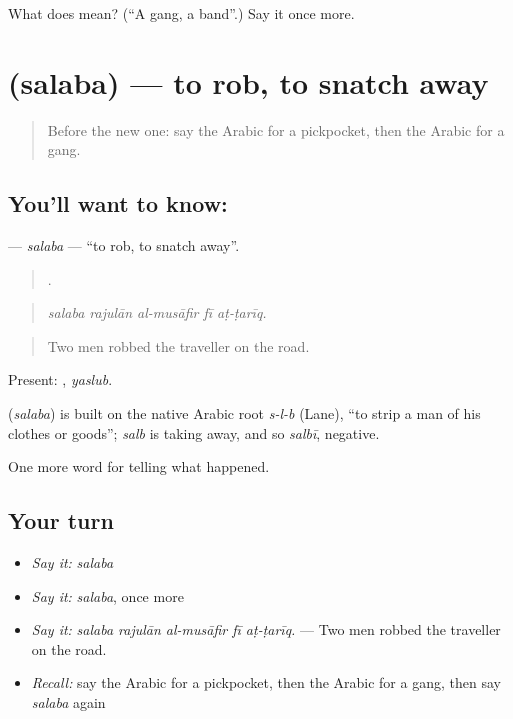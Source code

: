 \begin{tcolorbox}[breakable,colback=teal!4,colframe=teal!35!black,title={Before you move on}]
What does  mean? (\textquotedblleft{}A gang, a band\textquotedblright{}.) Say it once more.
\end{tcolorbox}
\section[\texorpdfstring{\ar{سلب} (salaba)}{سلب (salaba)}]{ (salaba) — to rob, to snatch away}

\label{lesson:AR-C321-salaba}



\begin{quote}
Before the new one: say the Arabic for a pickpocket, then the Arabic for a gang.
\end{quote}

\subsection*{You'll want to know: }
\textbf{} — \emph{salaba} — \textquotedblleft{}to rob, to snatch away\textquotedblright{}.

\begin{quote}
    .
\end{quote}

\begin{quote}
\emph{salaba rajulān al-musāfir fī aṭ-ṭarīq.}
\end{quote}

\begin{quote}
Two men robbed the traveller on the road.
\end{quote}

Present: , \emph{yaslub}.

\begin{cousinweb}
\textbf{} (\emph{salaba}) is built on the native Arabic root \emph{s-l-b} (Lane), \textquotedblleft{}to strip a man of his clothes or goods\textquotedblright{}; \emph{salb} is taking away, and so \emph{salbī}, negative.
\end{cousinweb}

\begin{grammarlens}[title={What you've built}]
One more word for telling what happened.
\end{grammarlens}

\subsection*{Your turn}
\begin{itemize}
\raggedright
  \item \emph{Say it:} \emph{salaba}
  \item \emph{Say it:} \emph{salaba}, once more
  \item \emph{Say it:} \emph{salaba rajulān al-musāfir fī aṭ-ṭarīq.} — Two men robbed the traveller on the road.
  \item \emph{Recall:} say the Arabic for a pickpocket, then the Arabic for a gang, then say \emph{salaba} again
\end{itemize}

